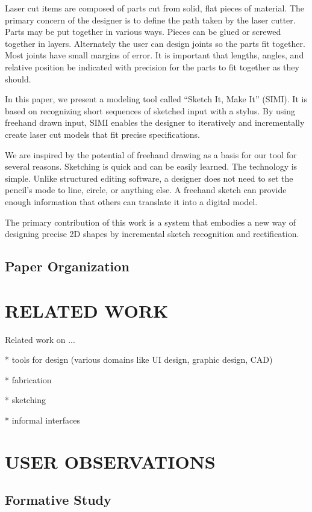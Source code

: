 \documentclass{article}
\begin{document}
Laser cut items are composed of parts cut from solid, flat pieces of
material. The primary concern of the designer is to define the path
taken by the laser cutter. Parts may be put together in various ways.
Pieces can be glued or screwed together in layers. Alternately the
user can design joints so the parts fit together. Most joints have
small margins of error. It is important that lengths, angles, and
relative position be indicated with precision for the parts to fit
together as they should.

In this paper, we present a modeling tool called ``Sketch It, Make
It'' (SIMI).  It is based on recognizing short sequences of sketched
input with a stylus. By using freehand drawn input, SIMI enables the
designer to iteratively and incrementally create laser cut models that
fit precise specifications.

We are inspired by the potential of freehand drawing as a basis for
our tool for several reasons. Sketching is quick and can be easily
learned. The technology is simple.  Unlike structured editing
software, a designer does not need to set the pencil's mode to line,
circle, or anything else. A freehand sketch can provide enough
information that others can translate it into a digital model. 

The primary contribution of this work is a system that embodies a new
way of designing precise 2D shapes by incremental sketch recognition
and rectification.

\subsection{Paper Organization}



\section{RELATED WORK}
Related work on ...

* tools for design (various domains like UI design, graphic design, CAD)

* fabrication

* sketching

* informal interfaces 

\section{USER OBSERVATIONS}

\subsection{Formative Study}
\label{sec:formative}
\end{document}
